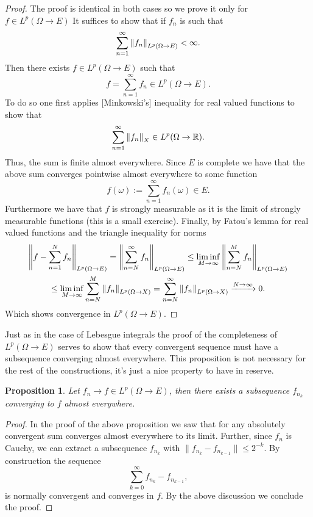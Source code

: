 \documentclass[12pt]{article}
\newtheorem{proposition}{Proposition}
\begin{document}
\begin{proof}
	The proof is identical in both cases so we prove it only for $f\in L^p(\Omega\to E)$
	It suffices to show that if $f_n$ is such that
	\begin{equation*}
		\sum_{n=1}^\infty \norm{f_n}_{L^p(\Omega\to E)}<\infty.
	\end{equation*}
	Then there exists $f\in L^p(\Omega\to E)$ such that
	\begin{equation*}
		f=\sum_{n=1}^\infty f_n\in L^p(\Omega\to E).
	\end{equation*}
	To do so one first applies [Minkowski's] inequality for real valued functions to show that
	\begin{equation*}
		\sum_{n=1}^\infty \norm{f_n}_X\in L^p(\Omega\to{\mathbb R}).
	\end{equation*}
	Thus, the sum is finite almost everywhere. Since $E$ is complete we have that the above sum converges pointwise almost everywhere to some function
	\begin{equation*}
		f(\omega):=\sum_{n=1}^\infty f_n(\omega)\in E.
	\end{equation*}
	Furthermore we have that $f$ is strongly measurable as it is the limit of strongly measurable functions (this is a small exercise). Finally, by Fatou's lemma for real valued functions and the triangle inequality for norms
	\begin{multline*}
		\norm{f-\sum_{n=1}^N f_n}_{L^p(\Omega\to E)}=\norm{\sum_{n=N}^\infty f_n}_{L^p(\Omega\to E)}\leq \liminf_{M\to \infty}\norm{\sum_{n=N}^M f_n}_{L^p(\Omega\to E)}\\\leq \liminf_{M\to \infty}\sum_{n=N}^M \norm{f_n}_{L^p(\Omega\to X)}=\sum_{n=N}^\infty \norm{f_n}_{L^p(\Omega\to X)}\xrightarrow{N\to\infty} 0.
	\end{multline*}
	Which shows convergence in $L^p(\Omega\to E)$.
\end{proof}
Just as in the case of Lebesgue integrals the proof of the completeness of $L^p(\Omega\to E)$ serves to show that every convergent sequence must have a subsequence converging almost everywhere. This proposition is not necessary for the rest of the constructions, it's just a nice property to have in reserve.
\begin{proposition}
	Let $f_n\to f\in L^p(\Omega\to E)$, then there exists a subsequence $f_{n_k}$ converging to $f$ almost everywhere.
\end{proposition}
\begin{proof}
	In the proof of the above proposition we saw that for any absolutely convergent sum converges almost everywhere to its limit. Further, since  $f_n$ is Cauchy, we can extract a subsequence  $f_{n_k}$ with  $\|f_{n_k}-f_{n_{k-1}}\|\leq 2^{-k}$. By construction the sequence
	\begin{equation*}
		\sum_{k=0}^{\infty} f_{n_k}-f_{n_{k-1}},
	\end{equation*}
	is normally convergent and converges in $f$. By the above discussion we conclude the proof.
\end{proof}
\end{document}
